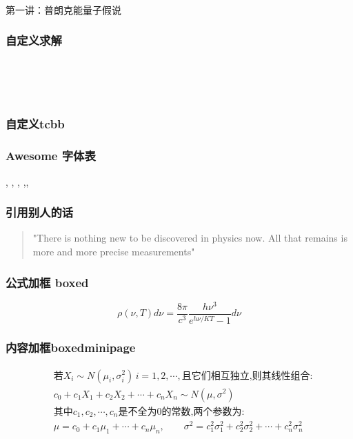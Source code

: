 \begin{frame} [plain]
  \frametitle{}
  \Background[1] 
  \begin{center}
  { {\huge 第一讲：普朗克能量子假说 }}
  \end{center}  
  \addtocounter{framenumber}{-1}   
\end{frame}

\begin{frame}
  \frametitle{自定义求解}
  \例[1、求下方程的解]{
      \[x^2+y^2=z^2\]}
  \解	\\
  \Tips \\
  \证 \\
\end{frame}

\begin{frame}
  \frametitle{自定义tcbb}
\end{frame}

\begin{frame}
  \frametitle{Awesome 字体表}
  \alert{\faHeartbeat, \faStar, \faThumbTack, \faThumbsUp,\faUniversity, \faCircle} 
\end{frame}

\begin{frame}
  \frametitle{引用别人的话}
  \begin{quotation}
    "There is nothing new to be discovered in physics now. All that remains is 
    more and more precise measurements"   \\
\end{quotation}  
\end{frame}

\begin{frame}
  \frametitle{公式加框 boxed}
  \begin{equation}
    \boxed{\rho(\nu, T) d \nu=\frac{8 \pi}{c^{3}} \frac{h \nu^{3}}{e^{h \nu / K T}-1} d \nu}
  \end{equation}
 
\end{frame}

\begin{frame}
  \frametitle{内容加框boxedminipage}
  \begin{boxedminipage}{0.9\linewidth}
    \[\begin{aligned}
    & \text{若}X_i\sim N(\mu_i,\sigma_i^2)\, i=1,2,\cdots,\text{且它们相互独立,则其线性组合:}\\
    & c_0+c_1X_1+c_2X_2+\cdots+c_nX_n\sim N(\mu,\sigma^2)\\
    & \text{其中}c_1,c_2,\cdots,c_n \text{是不全为0的常数,两个参数为:}\\
    & \mu=c_0+c_1\mu_1+\cdots+c_n\mu_n,\qquad \sigma^2=c_1^2\sigma_1^2+c_2^2\sigma_2^2+\cdots+c_n^2\sigma_n^2
    \end{aligned}\]
    \vspace{2pt}
    \end{boxedminipage}
\end{frame}


